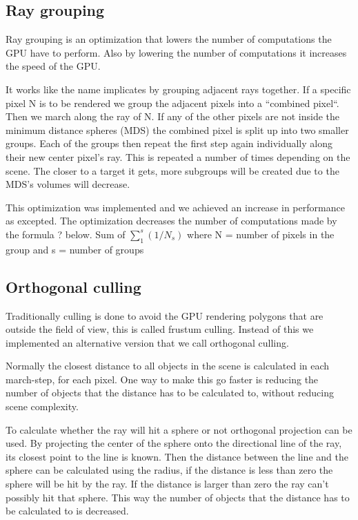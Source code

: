 		\subsection{Ray grouping}
		
			Ray grouping is an optimization that lowers the number of
			computations the GPU have to perform. Also by lowering the number of
			computations it increases the speed of the GPU.
			
			It works like the name implicates by grouping adjacent rays
			together. If a specific pixel N is to be rendered we group the
			adjacent pixels into a ``combined pixel``. Then we march along the
			ray of N. If any of the other pixels are not inside the minimum
			distance spheres (MDS) the combined pixel is split up into two
			smaller groups. Each of the groups then repeat the first step again
			individually along their new center pixel's ray. This is repeated a
			number of times depending on the scene.  The closer to a target it
			gets, more subgroups will be created due to the MDS's volumes will
			decrease.
			
			This optimization was implemented and we achieved an increase in
			performance as excepted. The optimization decreases the number of
			computations made by the formula ? below.  Sum of $\sum_1^s(1/N_s)$
			where N = number of pixels in the group and s = number of groups


		\subsection{Orthogonal culling}

			Traditionally culling is done to avoid the GPU rendering polygons 
			that are outside the field of view, this is called frustum culling. Instead 
			of this we implemented an alternative version that we call orthogonal
			culling.

			Normally the closest distance to all objects in the scene is calculated
			in each march-step, for each pixel. One way to make this go faster is 
			reducing the number of objects that the distance has to be calculated 
			to, without reducing scene complexity. 

			To calculate whether the ray will hit a sphere or not orthogonal 
			projection can be used. By projecting the center of the sphere onto
			the directional line of the ray, its closest point to the line is known.
			Then the distance between the line and the sphere can be calculated using
			the radius, if the distance is less than zero the sphere will be hit
			by the ray. If the distance is larger than zero the ray can't possibly hit 
			that sphere. This way the number of objects that the distance has to be 
			calculated to is decreased. 

